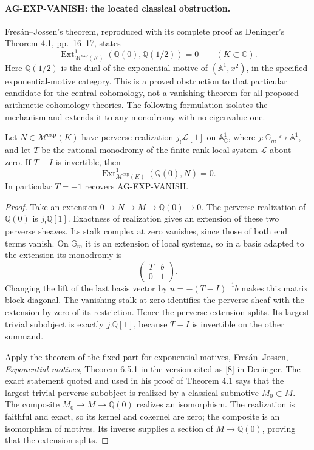 \paragraph{AG-EXP-VANISH: the located classical obstruction.}
Fresán--Jossen's theorem, reproduced with its complete proof as
Deninger's Theorem 4.1, pp.~16--17, states
\[
 \operatorname{Ext}^1_{\mathcal M^{\exp}(K)}
             (\mathbb Q(0),\mathbb Q(1/2))=0
                       \qquad(K\subset\mathbb C).
\]
Here $\mathbb Q(1/2)$ is the dual of the exponential motive
of $(\mathbb A^1,x^2)$, in the specified exponential-motive
category.  This is a proved obstruction to that particular
candidate for the central cohomology, not a vanishing theorem
for all proposed arithmetic cohomology theories.
The following formulation isolates the mechanism and extends it
to any monodromy with no eigenvalue one.

\begin{proposition}
Let $N\in\mathcal M^{\exp}(K)$ have perverse realization
$j_!\mathcal L[1]$ on $\mathbb A^1_{\mathbb C}$, where
$j:\mathbb G_m\hookrightarrow\mathbb A^1$, and let $T$
be the rational monodromy of the finite-rank local system
$\mathcal L$ about zero.  If $T-I$ is invertible, then
\[
 \operatorname{Ext}^1_{\mathcal M^{\exp}(K)}
                         (\mathbb Q(0),N)=0.
\]
In particular $T=-1$ recovers AG-EXP-VANISH.
\end{proposition}
\begin{proof}
Take an extension $0\to N\to M\to\mathbb Q(0)\to0$.
The perverse realization of $\mathbb Q(0)$ is
$j_!\mathbb Q[1]$.  Exactness of realization gives an
extension of these two perverse sheaves.  Its stalk complex
at zero vanishes, since those of both end terms vanish.
On $\mathbb G_m$ it is an extension of local systems, so in
a basis adapted to the extension its monodromy is
\[
                   \begin{pmatrix}T&b\\0&1\end{pmatrix}.
\]
Changing the lift of the last basis vector by
$u=-(T-I)^{-1}b$ makes this matrix block diagonal.
The vanishing stalk at zero identifies the perverse sheaf
with the extension by zero of its restriction.  Hence the
perverse extension splits.  Its largest trivial subobject
is exactly $j_!\mathbb Q[1]$, because $T-I$ is invertible
on the other summand.

Apply the theorem of the fixed part for exponential motives,
Fresán--Jossen, \emph{Exponential motives}, Theorem 6.5.1 in
the version cited as [8] in Deninger.  The exact statement
quoted and used in his proof of Theorem 4.1 says that the
largest trivial perverse subobject is realized
by a classical submotive $M_0\subset M$.  The composite
$M_0\to M\to\mathbb Q(0)$ realizes an isomorphism.
The realization is faithful and exact, so its kernel and
cokernel are zero; the composite is an isomorphism of motives.
Its inverse supplies a section of $M\to\mathbb Q(0)$,
proving that the extension splits.
\end{proof}


